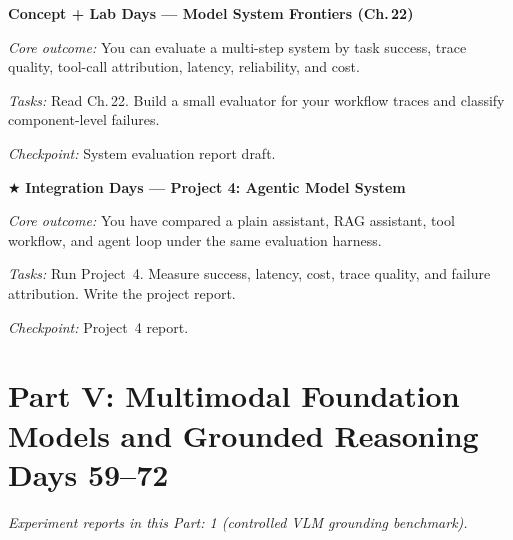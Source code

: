 \begin{description}[style=nextline, leftmargin=1.8cm, labelwidth=1.5cm]
\item[Day 53--54] \textbf{Concept + Lab Days --- Model System Frontiers (Ch.\,22)}

\textit{Core outcome:} You can evaluate a multi-step system by task success, trace quality, tool-call attribution, latency, reliability, and cost.

\textit{Tasks:} Read Ch.\,22. Build a small evaluator for your workflow traces and classify component-level failures.

\textit{Checkpoint:} System evaluation report draft.

\item[Day 55--58] $\bigstar$ \textbf{Integration Days --- Project 4: Agentic Model System}

\textit{Core outcome:} You have compared a plain assistant, RAG assistant, tool workflow, and agent loop under the same evaluation harness.

\textit{Tasks:} Run Project~4. Measure success, latency, cost, trace quality, and failure attribution. Write the project report.

\textit{Checkpoint:} Project~4 report.

\end{description}

\section*{Part V: Multimodal Foundation Models and Grounded Reasoning \hfill Days 59--72}

\medskip
\noindent\textit{Experiment reports in this Part: 1 (controlled VLM grounding benchmark).}

